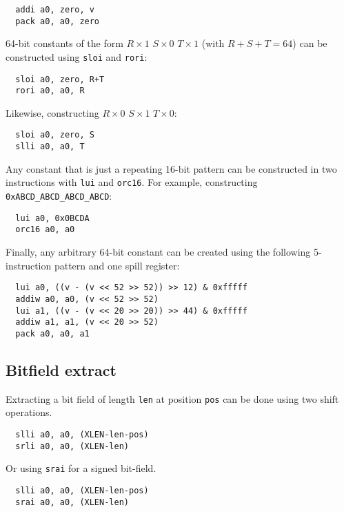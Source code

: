 \begin{verbatim}
  addi a0, zero, v
  pack a0, a0, zero
\end{verbatim}

64-bit constants of the form $R\times1$ $S\times0$ $T\times1$ (with $R+S+T=64$)
can be constructed using {\tt sloi} and {\tt rori}:

\begin{verbatim}
  sloi a0, zero, R+T
  rori a0, a0, R
\end{verbatim}

Likewise, constructing $R\times0$ $S\times1$ $T\times0$:

\begin{verbatim}
  sloi a0, zero, S
  slli a0, a0, T
\end{verbatim}

Any constant that is just a repeating 16-bit pattern can be constructed
in two instructions with {\tt lui} and {\tt orc16}. For example,
constructing {\tt 0xABCD\_ABCD\_ABCD\_ABCD}:

\begin{verbatim}
  lui a0, 0x0BCDA
  orc16 a0, a0
\end{verbatim}

Finally, any arbitrary 64-bit constant can be created using the following
5-instruction pattern and one spill register:

\begin{verbatim}
  lui a0, ((v - (v << 52 >> 52)) >> 12) & 0xfffff
  addiw a0, a0, (v << 52 >> 52)
  lui a1, ((v - (v << 20 >> 20)) >> 44) & 0xfffff
  addiw a1, a1, (v << 20 >> 52)
  pack a0, a0, a1
\end{verbatim}


\subsection{Bitfield extract}

Extracting a bit field of length {\tt len} at position {\tt pos} can be done using
two shift operations.

\begin{verbatim}
  slli a0, a0, (XLEN-len-pos)
  srli a0, a0, (XLEN-len)
\end{verbatim}

Or using {\tt srai} for a signed bit-field.

\begin{verbatim}
  slli a0, a0, (XLEN-len-pos)
  srai a0, a0, (XLEN-len)
\end{verbatim}

